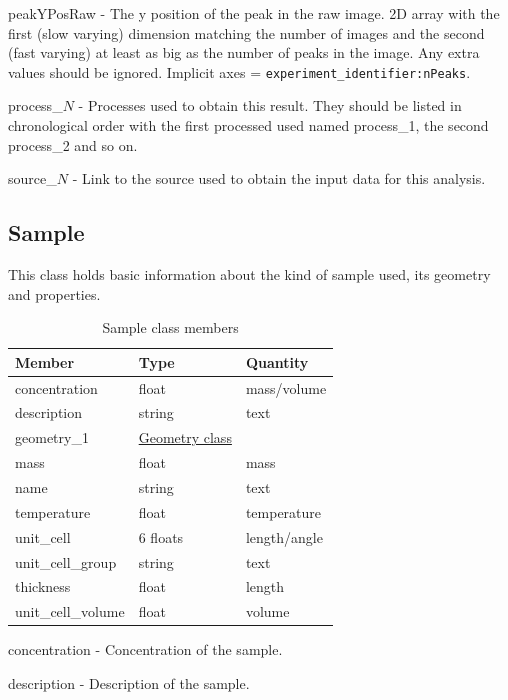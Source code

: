 \documentclass[usletter,11pt]{article}
\newcommand{\member}[2]
{ \noindent
{ \color{softBlue}  #1 - } #2
\vspace{0.2cm}
}
\begin{document}
\member{peakYPosRaw}{The y position of the peak in the raw image. 2D array with the
  first (slow varying) dimension matching the number of images and the second
  (fast varying) at least as big as the number of peaks in
  the image. Any extra values should be ignored. Implicit axes = {\tt experiment\_identifier:nPeaks}.}

\member{process\_$N$}{Processes used to obtain this result. They should
be listed in chronological order with the first processed used named
process\_1, the second process\_2 and so on.}

\member{source\_$N$}{Link to the source used to obtain the input data for this analysis.}

\subsection{Sample}
\label{table:sample}

This class holds basic information about the kind of sample used, its
geometry and properties.

\begin{table}[h!]\sffamily \footnotesize
\caption{Sample class members}

\begin{tabular}{p{4.5cm} p{4.5cm}  p{2.5cm} }
\toprule
\bfseries Member     & \bfseries Type & \bfseries Quantity \\
\midrule
concentration & float & mass/volume \\
description & string & text \\
geometry\_1 &  \hyperref[table:geometry]{Geometry class} & \\
mass & float & mass \\
name & string & text \\
temperature     & float & temperature  \\
unit\_cell & 6 floats & length/angle \\
unit\_cell\_group & string & text \\
thickness & float & length \\
unit\_cell\_volume & float & volume \\
\bottomrule
\end{tabular}
\end{table}

\member{concentration}{Concentration of the sample.}

\member{description}{Description of the sample.}
\end{document}
